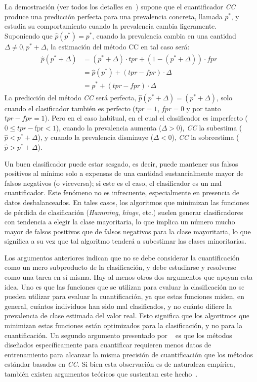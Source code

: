 La demostración (ver todos los detalles en~\citep[p.170]{forman2008quantifying})
supone que el cuantificador {\it CC\/} produce una predicción perfecta para una
prevalencia concreta, llamada $p^*$, y estudia su comportamiento cuando la
prevalencia cambia ligeramente. Suponiendo que $\hat p(p^*) = p^*$, cuando la
prevalencia cambia en una cantidad $\Delta \neq 0, p^* + \Delta$, la estimación
del método CC en tal caso será:
\begin{align}
\begin{split}
    \hat p(p^* + \Delta) &= (p^* + \Delta) \cdot {tpr} + (1-(p^* + \Delta)) \cdot {fpr} \\
    &= \hat p(p^*) + ({tpr} - {fpr}) \cdot \Delta \\
    &= p^* + ({tpr} - {fpr}) \cdot \Delta
\end{split}
\end{align}
La predicción del método {\it CC\/} será perfecta, $\hat p(p^* + \Delta) = (p^*
+ \Delta)$, solo cuando el clasificador también es perfecto (${tpr} = 1$, ${fpr}
= 0$ y por tanto ${tpr} - {fpr} = 1$). Pero en el caso habitual, en el cual el
clasificador es imperfecto ($0 \leq {tpr} - \text {fpr} < 1$), cuando la
prevalencia aumenta ($\Delta > 0$), {\it CC\/} la subestima ($\hat p < p^* +
\Delta $), y cuando la prevalencia disminuye ($\Delta < 0$), {\it CC\/} la
sobreestima ($\hat p > p^* + \Delta $).

Un buen clasificador puede estar sesgado, es decir, puede mantener sus falsos
positivos al mínimo solo a expensas de una cantidad sustancialmente mayor de
falsos negativos (o viceversa); si este es el caso, el clasificador es un mal
cuantificador. Este fenómeno no es infrecuente, especialmente en presencia de
datos desbalanceados. En tales casos, los algoritmos que minimizan las funciones
de pérdida de clasificación ({\it Hamming}, {\it hinge}, etc.) suelen generar
clasificadores con tendencia a elegir la clase mayoritaria, lo que implica un
número mucho mayor de falsos positivos que de falsos negativos para la clase
mayoritaria, lo que significa a su vez que tal algoritmo tenderá a subestimar
las clases minoritarias.

Los argumentos anteriores indican que no se debe considerar la cuantificación
como un mero subproducto de la clasificación, y debe estudiarse y resolverse
como una tarea en sí misma. Hay al menos otros dos argumentos que apoyan esta
idea. Uno es que las funciones que se utilizan para evaluar la clasificación no
se pueden utilizar para evaluar la cuantificación, ya que estas funciones miden,
en general, cuántos individuos han sido mal clasificados, y no cuánto difiere la
prevalencia de clase estimada del valor real. Esto significa que los algoritmos
que minimizan estas funciones están optimizados para la clasificación, y no para
la cuantificación. Un segundo argumento presentado por
~\citet{forman2008quantifying} es que los métodos diseñados específicamente para
cuantificar requieren menos datos de entrenamiento para alcanzar la misma
precisión de cuantificación que los métodos estándar basados en {\it CC}. Si
bien esta observación es de naturaleza empírica, también existen argumentos
teóricos que sustentan este hecho~\cite{vapnik1999overview}.

